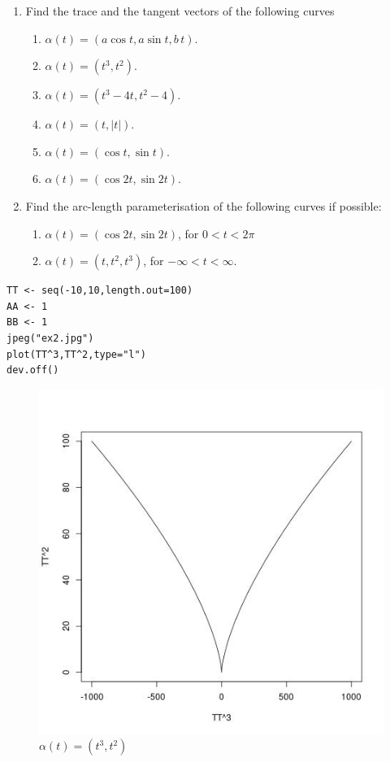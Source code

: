 \documentclass{amsart}
\begin{document}
\begin{enumerate}
\item Find the trace and the tangent vectors of the following curves
\begin{enumerate}
\item \(\alpha(t)  = (a \cos t, a \sin t, b\,t)\).
\item \(\alpha(t)  = ( t^3, t^2)\).
\item \(\alpha(t)  = (t^3 -4t, t^2 -4)\).
\item \(\alpha(t)  = (t, |t|)\).
\item \(\alpha(t)  = (\cos t, \sin t)\).
\item \(\alpha(t)  = (\cos 2t, \sin 2t)\).
\end{enumerate}

\item Find the arc-length parameterisation of the following curves if possible:

\begin{enumerate}
\item \(\alpha(t)  = (\cos 2t, \sin 2t)\), for \(0 < t < 2\pi\)

\item \(\alpha(t) = (t, t^2, t^3)\), for \(-\infty < t < \infty\).
\end{enumerate}
\end{enumerate}



\begin{verbatim}
TT <- seq(-10,10,length.out=100)
AA <- 1
BB <- 1
jpeg("ex2.jpg")
plot(TT^3,TT^2,type="l")
dev.off()
\end{verbatim}
\begin{figure}[htbp]
\centering
\includegraphics[width=.9\linewidth]{img.jpg}
\caption{\(\alpha(t)  = ( t^3, t^2)\)}
\end{figure}
\end{document}

